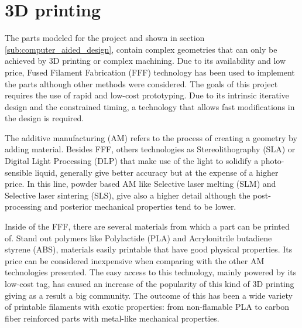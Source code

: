 \section{3D printing} %
\label{sec:3d_printing}
The parts modeled for the project and shown in section \ref{sub:computer_aided_design}, contain complex geometries that can only be achieved by 3D printing or complex machining.
Due to its availability and low price, Fused Filament Fabrication (FFF) technology has been used to implement the parts although other methods were considered.
The goals of this project requires the use of rapid and low-cost prototyping. 
Due to its intrinsic iterative design and the constrained timing, a technology that allows fast modifications in the design is required.

The additive manufacturing (AM) refers to the process of creating a geometry by adding material.
Besides FFF, others technologies as Stereolithography (SLA) or Digital Light Processing (DLP) that make use of the light to solidify a photo-sensible liquid, generally give better accuracy but at the expense of a higher price.
In this line, powder based AM like Selective laser melting (SLM) and Selective laser sintering (SLS), give also a higher detail although the post-processing and posterior mechanical properties tend to be lower.

Inside of the FFF, there are several materials from which a part can be printed of.
Stand out polymers like Polylactide (PLA) and Acrylonitrile butadiene styrene (ABS), materials easily printable that have good physical properties.
Its price can be considered inexpensive when comparing with the other AM technologies presented.
The easy access to this technology, mainly powered by its low-cost tag, has caused an increase of the popularity of this kind of 3D printing giving as a result a big community.
The outcome of this has been a wide variety of printable filaments with exotic properties: from non-flamable PLA to carbon fiber reinforced parts with metal-like mechanical properties.

